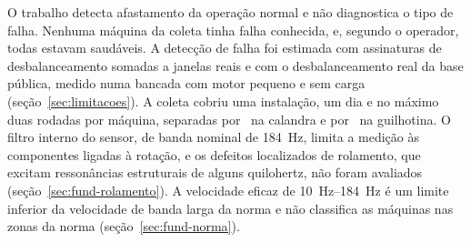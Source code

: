 O trabalho detecta afastamento da operação normal e não diagnostica o tipo de falha. Nenhuma máquina da coleta tinha falha conhecida, e, segundo o operador, todas estavam saudáveis. A detecção de falha foi estimada com assinaturas de desbalanceamento somadas a janelas reais e com o desbalanceamento real da base pública, medido numa bancada com motor pequeno e sem carga (seção~\ref{sec:limitacoes}). A coleta cobriu uma instalação, um dia e no máximo duas rodadas por máquina, separadas por \campoIntervaloCalandra\ na calandra e por \campoIntervaloGuilhotina\ na guilhotina. O filtro interno do sensor, de banda nominal de \SI{184}{\hertz}, limita a medição às componentes ligadas à rotação, e os defeitos localizados de rolamento, que excitam ressonâncias estruturais de alguns quilohertz, não foram avaliados (seção~\ref{sec:fund-rolamento}). A velocidade eficaz de \SIrange{10}{184}{\hertz} é um limite inferior da velocidade de banda larga da norma e não classifica as máquinas nas zonas da norma (seção~\ref{sec:fund-norma}).
